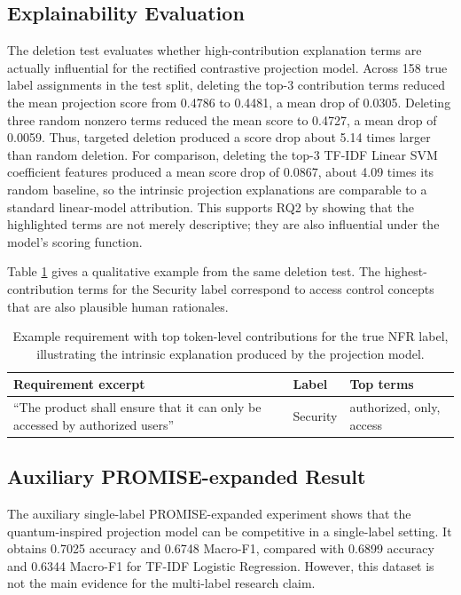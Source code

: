 \documentclass[runningheads]{llncs}
\begin{document}
\subsection{Explainability Evaluation}
The deletion test evaluates whether high-contribution explanation terms are
actually influential for the rectified contrastive projection model. Across 158
true label assignments in the test split, deleting the top-3 contribution terms
reduced the mean projection score from 0.4786 to 0.4481, a mean drop of 0.0305.
Deleting three random nonzero terms reduced the mean score to 0.4727, a mean
drop of 0.0059. Thus, targeted deletion produced a score drop about 5.14 times
larger than random deletion. For comparison, deleting the top-3 TF-IDF Linear
SVM coefficient features produced a mean score drop of 0.0867, about 4.09 times
its random baseline, so the intrinsic projection explanations are comparable to
a standard linear-model attribution. This supports RQ2 by showing that the
highlighted terms are not merely descriptive; they are also influential under
the model's scoring function.

Table \ref{tab:qualitative} gives a qualitative example from the same deletion
test. The highest-contribution terms for the Security label correspond to access
control concepts that are also plausible human rationales.

\begin{table}[htbp]
\centering
\caption{Example requirement with top token-level contributions for the true NFR label, illustrating the intrinsic explanation produced by the projection model.}
\label{tab:qualitative}
\begin{tabular}{p{}p{}p{}}
\toprule
Requirement excerpt & Label & Top terms \\
\midrule
``The product shall ensure that it can only be accessed by authorized users'' & Security & authorized, only, access \\
\bottomrule
\end{tabular}
\end{table}

\subsection{Auxiliary PROMISE-expanded Result}
The auxiliary single-label PROMISE-expanded experiment shows that the
quantum-inspired projection model can be competitive in a single-label setting.
It obtains 0.7025 accuracy and 0.6748 Macro-F1, compared with 0.6899 accuracy
and 0.6344 Macro-F1 for TF-IDF Logistic Regression. However, this dataset is
not the main evidence for the multi-label research claim.
\end{document}

